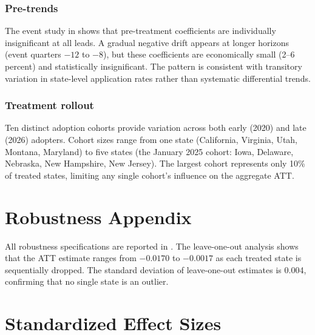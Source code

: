\documentclass[12pt]{article}
\begin{document}
\subsubsection*{Pre-trends} The event study in  shows that pre-treatment coefficients are individually insignificant at all leads. A gradual negative drift appears at longer horizons (event quarters $-12$ to $-8$), but these coefficients are economically small (2--6 percent) and statistically insignificant. The pattern is consistent with transitory variation in state-level application rates rather than systematic differential trends.

\subsubsection*{Treatment rollout} Ten distinct adoption cohorts provide variation across both early (2020) and late (2026) adopters. Cohort sizes range from one state (California, Virginia, Utah, Montana, Maryland) to five states (the January 2025 cohort: Iowa, Delaware, Nebraska, New Hampshire, New Jersey). The largest cohort represents only 10\% of treated states, limiting any single cohort's influence on the aggregate ATT.

\section{Robustness Appendix}

All robustness specifications are reported in . The leave-one-out analysis shows that the ATT estimate ranges from $-0.0170$ to $-0.0017$ as each treated state is sequentially dropped. The standard deviation of leave-one-out estimates is 0.004, confirming that no single state is an outlier.

\section{Standardized Effect Sizes}
\label{sec:sde}


\end{document}
